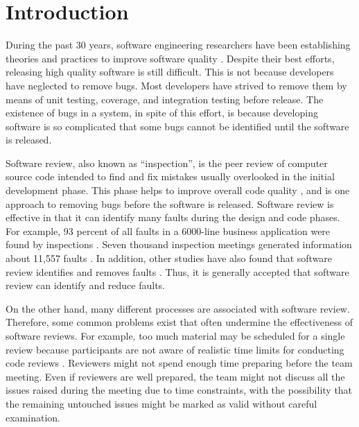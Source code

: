 
\chapter{Introduction}
\label{ch:introduction}

During the past 30 years, software engineering researchers have been establishing theories and practices to improve software quality \cite{parnas:role}. Despite their best efforts, releasing high quality software is still difficult. This is not because developers have neglected to remove bugs. Most developers have strived to remove them by means of unit testing, coverage, and integration testing before release. The existence of bugs in a system, in spite of this effort, is because developing software is so complicated that some bugs cannot be identified until the software is released.

Software review, also known as ``inspection'', is the peer review of computer source code intended to find and fix mistakes usually overlooked in the initial development phase. This phase helps to improve overall code quality \cite{wikipedia}, and is one approach to removing bugs before the software is released. Software review is effective in that it can identify many faults during the design and code phases. For example, 93 percent of all faults in a 6000-line business application were found by inspections \cite{pfleeger:software}. Seven thousand inspection meetings generated information about 11,557 faults \cite{pfleeger:software}. In addition, other studies have also found that software review identifies and removes faults \cite{gilb:software}. Thus, it is generally accepted that software review can identify and reduce faults.

On the other hand, many different processes are associated with software review. Therefore, some common problems exist that often undermine the effectiveness of software reviews. For example, too much material may be scheduled for a single review because participants are not aware of realistic time limits for conducting code reviews \cite{wiegers:seven}. Reviewers might not spend enough time preparing before the team meeting. Even if reviewers are well prepared, the team might not discuss all the issues raised during the meeting due to time constraints, with the possibility that the remaining untouched issues might be marked as valid without careful examination.

